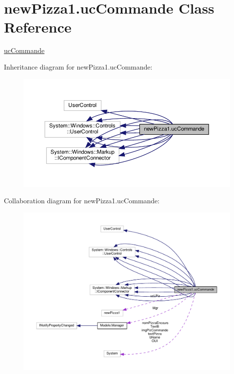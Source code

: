 \hypertarget{classnewPizza1_1_1ucCommande}{}\section{new\+Pizza1.\+uc\+Commande Class Reference}
\label{classnewPizza1_1_1ucCommande}


\hyperlink{classnewPizza1_1_1ucCommande}{uc\+Commande}  




Inheritance diagram for new\+Pizza1.\+uc\+Commande\+:
\nopagebreak
\begin{figure}[H]
\begin{center}
\leavevmode
\includegraphics[width=350pt]{classnewPizza1_1_1ucCommande__inherit__graph}
\end{center}
\end{figure}


Collaboration diagram for new\+Pizza1.\+uc\+Commande\+:
\nopagebreak
\begin{figure}[H]
\begin{center}
\leavevmode
\includegraphics[width=350pt]{classnewPizza1_1_1ucCommande__coll__graph}
\end{center}
\end{figure}
